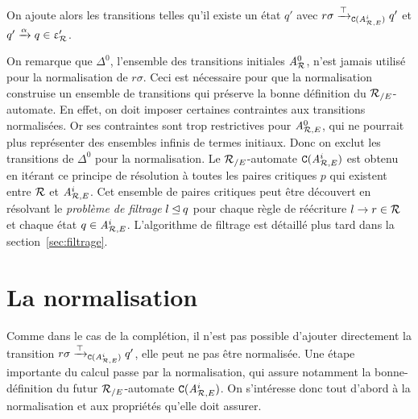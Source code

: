 On ajoute alors les transitions telles qu'il existe un état $q'$ avec
$r\sigma \xrightarrow{\top}_{\mathtt{C}({\mathit A}_{\mathcal R,E}^i)} q'$ et $q'\xrightarrow{\alpha} q \in \upvarepsilon_{\mathcal R}'$. 

On remarque que $\Delta^0$, l'ensemble des transitions initiales ${\mathit A}_{\mathcal R}^0$, n'est jamais utilisé
pour la normalisation de $r\sigma$. Ceci est nécessaire pour que la normalisation construise un ensemble de transitions
qui préserve la bonne définition du ${\mathcal R_{/E}}$-automate.
En effet, on doit imposer certaines contraintes aux transitions normalisées. Or ses contraintes
sont trop restrictives pour ${\mathit A}_{\mathcal R,E}^0$, qui ne pourrait plus représenter des ensembles infinis de termes initiaux.
Donc on exclut les transitions de $\Delta^0$ pour la normalisation.
Le ${\mathcal R_{/E}}$-automate $\mathtt{C}({\mathit A}_{\mathcal R,E}^i)$ est obtenu en itérant ce
principe de résolution à toutes les paires critiques $p$ qui existent
entre $\mathcal R$ et ${\mathit A}_{\mathcal R,E}^i$. Cet ensemble de paires critiques peut être découvert
 en résolvant le {\em problème de filtrage} $l \unlhd q$ pour chaque règle de
 réécriture $l \rightarrow r\in \mathcal R$ et chaque état $q\in{\mathit A}_{\mathcal R,E}^i$.
L'algorithme de filtrage est détaillé plus tard dans la section~\ref{sec:filtrage}.

\section{La normalisation}
Comme dans le cas de la complétion, il n'est pas possible d'ajouter directement
la transition $r\sigma \xrightarrow{\top}_{\mathtt{C}({\mathit A}_{\mathcal R,E}^{i})} q'$, elle peut ne pas être normalisée.
Une étape importante du calcul passe par la normalisation, qui assure notamment la bonne-définition
du futur ${\mathcal R_{/E}}$-automate $\mathtt{C}({\mathit A}_{\mathcal R,E}^{i})$. 
On s'intéresse donc tout d'abord à la normalisation et aux propriétés qu'elle doit assurer.



